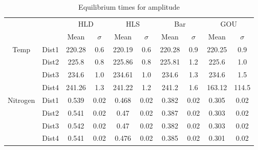 \begin{table}[h]
\centering
\caption{Equilibrium times for amplitude}
\label{table:5}
\begin{tabular}{cccccccccc}
\toprule
{} & {} & \multicolumn{2}{c}{HLD} & \multicolumn{2}{c}{HLS} & \multicolumn{2}{c}{Bar} & \multicolumn{2}{c}{GOU} \\
{} & {} & {Mean} & {$\sigma$} & {Mean} & {$\sigma$} & {Mean} & {$\sigma$} & {Mean} & {$\sigma$} \\
\midrule
\multirow[c]{4}{*}{Temp} & Dist1 & 220.28 & 0.6 & 220.19 & 0.6 & 220.28 & 0.9 & 220.25 & 0.9 \\
 & Dist2 & 225.8 & 0.8 & 225.86 & 0.8 & 225.81 & 1.2 & 225.6 & 1.0 \\
 & Dist3 & 234.6 & 1.0 & 234.61 & 1.0 & 234.6 & 1.3 & 234.6 & 1.5 \\
 & Dist4 & 241.26 & 1.3 & 241.22 & 1.2 & 241.2 & 1.6 & 163.12 & 114.5 \\
\multirow[c]{4}{*}{Nitrogen} & Dist1 & 0.539 & 0.02 & 0.468 & 0.02 & 0.382 & 0.02 & 0.305 & 0.02 \\
 & Dist2 & 0.541 & 0.02 & 0.47 & 0.02 & 0.387 & 0.02 & 0.303 & 0.02 \\
 & Dist3 & 0.542 & 0.02 & 0.47 & 0.02 & 0.382 & 0.02 & 0.303 & 0.02 \\
 & Dist4 & 0.541 & 0.02 & 0.476 & 0.02 & 0.385 & 0.02 & 0.301 & 0.02 \\
\bottomrule
\end{tabular}
\end{table}
